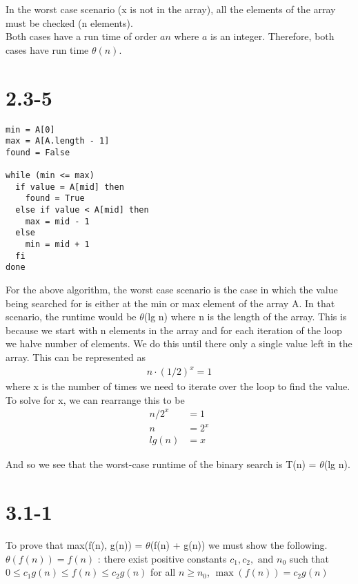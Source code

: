 \documentclass{article}
\begin{document}
{\noindent
In the worst case scenario (x is not in the array), all the elements of
  the array must be checked (n elements). \\

\noindent
Both cases have a run time of order $an$ where $a$ is an integer.
  Therefore, both cases have run time
$\theta(n)$.

\section{2.3-5}
\begin{verbatim}
min = A[0]
max = A[A.length - 1]
found = False

while (min <= max)
  if value = A[mid] then
    found = True
  else if value < A[mid] then
    max = mid - 1
  else
    min = mid + 1
  fi
done
\end{verbatim}

\noindent
For the above algorithm, the worst case scenario is the case in which the value
being searched for is either at the min or max element of the array A. In
that scenario, the runtime would be $\theta$(lg n) where n is the length of the
array. This is because we start with n elements in the array and for each
iteration of the loop we halve number of elements. We do this until there
only a single value left in the array. This can be represented as
\begin{align*}
  n \cdot (1/2)^x = 1
\end{align*}
where x is the number of times we need to iterate over the loop to find
the value. To solve for x, we can rearrange this to be
\begin{align*}
  n/2^x &= 1 \\
  n &= 2^x \\
  lg(n) &= x
\end{align*}

And so we see that the worst-case runtime of the binary search is
T(n) = $\theta$(lg n).
\section{3.1-1}
To prove that max(f(n), g(n)) = $\theta$(f(n) + g(n)) we must show the
  following. \\

\noindent
$\theta(f(n)) = f(n)$ : there exist positive constants $c_1, c_2,
  \text{ and } n_0$ such that $0 \leq c_1g(n) \leq f(n) \leq c_2g(n)$
  for all $n \geq n_0$, $\max(f(n)) = c_2g(n)$ \\

}
\end{document}
